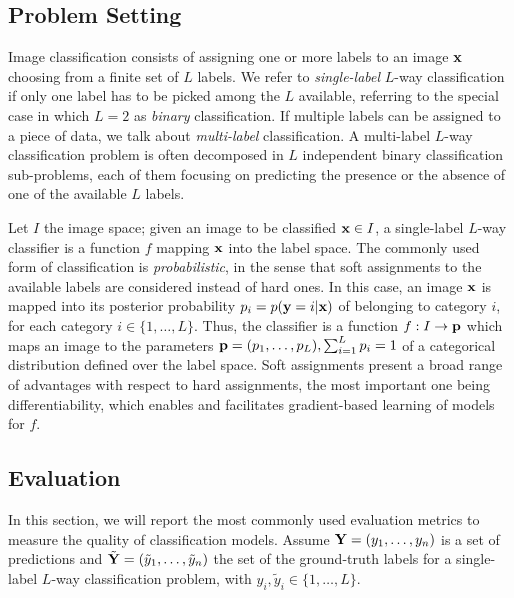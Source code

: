 \subsection{Problem Setting}
\label{subsec:back:classification}
Image classification consists of assigning one or more labels to an image $\mathbf{x}$ choosing from a finite set of $L$ labels.
We refer to \emph{single-label} $L$-way classification if only one label has to be picked among the $L$ available, referring to the special case in which $L=2$ as \emph{binary} classification.
If multiple labels can be assigned to a piece of data, we talk about \emph{multi-label} classification.
A multi-label $L$-way classification problem is often decomposed in $L$ independent binary classification sub-problems, each of them focusing on predicting the presence or the absence of one of the available $L$ labels.

Let $I$ the image space;
given an image to be classified $\mathbf{x} \in I$, a single-label $L$-way classifier is a function $f$ mapping $\mathbf{x}$ into the label space.
The commonly used form of classification is \emph{probabilistic}, in the sense that soft assignments to the available labels are considered instead of hard ones.
In this case, an image $\mathbf{x}$ is mapped into its posterior probability $p_i = p(\mathbf{y} = i | \mathbf{x})$ of belonging to category $i$, for each category $i \in \{1, \dots, L\}$.
Thus, the classifier is a function $f: I \to \mathbf{p}$ which maps an image to the parameters $\mathbf{p} = (p_1, \ldots, p_L), \sum_{i=1}^L p_i = 1$ of a categorical distribution defined over the label space.
Soft assignments present a broad range of advantages with respect to hard assignments, the most important one being differentiability, which enables and facilitates gradient-based learning of models for $f$.


\subsection{Evaluation}
\label{subsec:back:classif-eval}

In this section, we will report the most commonly used evaluation metrics to measure the quality of classification models.
Assume $\mathbf{Y} = (y_1, \ldots, y_n)$ is a set of predictions and $\tilde{\mathbf{Y}} = (\tilde{y}_1, \ldots, \tilde{y}_n)$ the set of the ground-truth labels for a single-label $L$-way classification problem, with $y_i, \tilde{y}_i \in \{1, \ldots, L\}$. %

